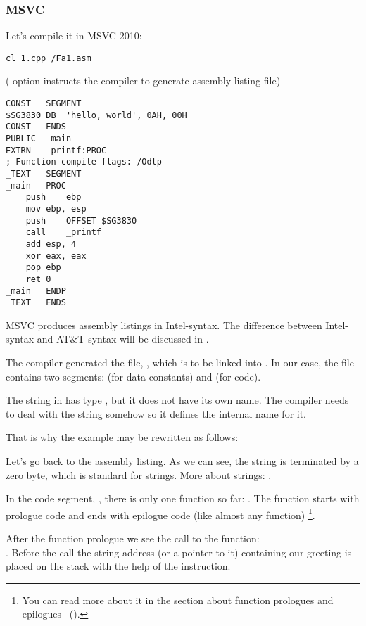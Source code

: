 \subsubsection{MSVC}

Let's compile it in MSVC 2010:

\begin{lstlisting}
cl 1.cpp /Fa1.asm
\end{lstlisting}

( option instructs the compiler to generate assembly listing file)

\begin{lstlisting}[caption=MSVC 2010]
CONST	SEGMENT
$SG3830	DB	'hello, world', 0AH, 00H
CONST	ENDS
PUBLIC	_main
EXTRN	_printf:PROC
; Function compile flags: /Odtp
_TEXT	SEGMENT
_main	PROC
	push	ebp
	mov	ebp, esp
	push	OFFSET $SG3830
	call	_printf
	add	esp, 4
	xor	eax, eax
	pop	ebp
	ret	0
_main	ENDP
_TEXT	ENDS
\end{lstlisting}

MSVC produces assembly listings in Intel-syntax.
The difference between Intel-syntax and AT\&T-syntax will be discussed in .

The compiler generated the file, , which is to be linked into .
In our case, the file contains two segments:  (for data constants) and  (for code).

\label{string_is_const_char}
The string  in \CCpp has type , but it does not have its own name.
The compiler needs to deal with the string somehow so it defines the internal name  for it.

That is why the example may be rewritten as follows:



Let's go back to the assembly listing. As we can see, the string is terminated by a zero byte, which is standard for \CCpp strings.
More about \CCpp strings: .

In the code segment, , there is only one function so far: \main{}.
The function \main starts with prologue code and ends with epilogue code (like almost any function)
\footnote{You can read more about it in the section about function prologues and epilogues ~().}.

After the function prologue we see the call to the \printf{} function:\\
.
Before the call the string address (or a pointer to it) containing our greeting is placed on the stack with the help of the \PUSH instruction.

